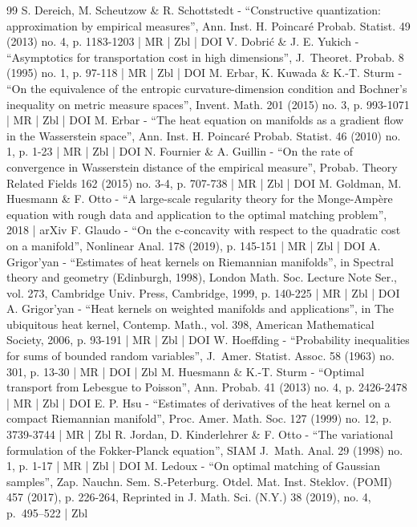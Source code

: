 \documentclass[10pt]{amsart}
\theoremstyle{plain}
\theoremstyle{definition}
\numberwithin{equation}{section}
\begin{document}
\begin{thebibliography}{99}
S. Dereich, M. Scheutzow \& R. Schottstedt - “Constructive quantization: approximation by empirical measures”, Ann. Inst. H. Poincaré Probab. Statist. 49 (2013) no. 4, p. 1183-1203 | MR | Zbl | DOI
V. Dobrić \& J. E. Yukich - “Asymptotics for transportation cost in high dimensions”, J. Theoret. Probab. 8 (1995) no. 1, p. 97-118 | MR | Zbl | DOI
M. Erbar, K. Kuwada \& K.-T. Sturm - “On the equivalence of the entropic curvature-dimension condition and Bochner’s inequality on metric measure spaces”, Invent. Math. 201 (2015) no. 3, p. 993-1071 | MR | Zbl | DOI
M. Erbar - “The heat equation on manifolds as a gradient flow in the Wasserstein space”, Ann. Inst. H. Poincaré Probab. Statist. 46 (2010) no. 1, p. 1-23 | MR | Zbl | DOI
N. Fournier \& A. Guillin - “On the rate of convergence in Wasserstein distance of the empirical measure”, Probab. Theory Related Fields 162 (2015) no. 3-4, p. 707-738 | MR | Zbl | DOI
M. Goldman, M. Huesmann \& F. Otto - “A large-scale regularity theory for the Monge-Ampère equation with rough data and application to the optimal matching problem”, 2018 | arXiv
F. Glaudo - “On the c-concavity with respect to the quadratic cost on a manifold”, Nonlinear Anal. 178 (2019), p. 145-151 | MR | Zbl | DOI
A. Grigor’yan - “Estimates of heat kernels on Riemannian manifolds”, in Spectral theory and geometry (Edinburgh, 1998), London Math. Soc. Lecture Note Ser., vol. 273, Cambridge Univ. Press, Cambridge, 1999, p. 140-225 | MR | Zbl | DOI
A. Grigor’yan - “Heat kernels on weighted manifolds and applications”, in The ubiquitous heat kernel, Contemp. Math., vol. 398, American Mathematical Society, 2006, p. 93-191 | MR | Zbl | DOI
W. Hoeffding - “Probability inequalities for sums of bounded random variables”, J. Amer. Statist. Assoc. 58 (1963) no. 301, p. 13-30 | MR | DOI | Zbl
M. Huesmann \& K.-T. Sturm - “Optimal transport from Lebesgue to Poisson”, Ann. Probab. 41 (2013) no. 4, p. 2426-2478 | MR | Zbl | DOI
E. P. Hsu - “Estimates of derivatives of the heat kernel on a compact Riemannian manifold”, Proc. Amer. Math. Soc. 127 (1999) no. 12, p. 3739-3744 | MR | Zbl
R. Jordan, D. Kinderlehrer \& F. Otto - “The variational formulation of the Fokker-Planck equation”, SIAM J. Math. Anal. 29 (1998) no. 1, p. 1-17 | MR | Zbl | DOI
M. Ledoux - “On optimal matching of Gaussian samples”, Zap. Nauchn. Sem. S.-Peterburg. Otdel. Mat. Inst. Steklov. (POMI) 457 (2017), p. 226-264, Reprinted in J. Math. Sci. (N.Y.) 38 (2019), no. 4, p. 495–522 | Zbl

\end{thebibliography}
\end{document}

